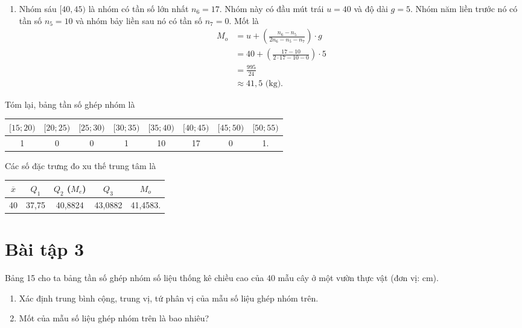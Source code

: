 \documentclass[
  letterpaper,
  DIV=11,
  numbers=noendperiod]{scrartcl}
\providecommand{\tightlist}{%
  \setlength{\itemsep}{0pt}\setlength{\parskip}{0pt}}\usepackage{longtable,booktabs,array}
\begin{document}
\begin{enumerate}
\def\labelenumi{\alph{enumi}.}
\setcounter{enumi}{2}
\tightlist
\item
  Nhóm sáu \([40,45)\) là nhóm có tần số lớn nhất \(n_6=17\). Nhóm này
  có đầu mút trái \(u=40\) và độ dài \(g=5\). Nhóm năm liền trước nó có
  tần số \(n_5=10\) và nhóm bảy liền sau nó có tần số \(n_7=0\). Mốt là
  \begin{align*}
  M_o 
   & = u + \left(\frac{n_6-n_5}{2n_6 - n_5 - n_7}\right)\cdot g \\
   & = 40 + \left(\frac{17-10}{2\cdot 17 - 10 - 0}\right)\cdot 5 \\
   & = \frac{995}{24} \\
   & \approx 41,5 \text{ (kg).}
  \end{align*}
\end{enumerate}

Tóm lại, bảng tần số ghép nhóm là

\begin{center}
\begin{tabular}{|c|c|c|c|c|c|c|c|}
\hline 
$[15;20)$ & $[20; 25)$ & $[25; 30)$ & $[30; 35)$ & $[35;40)$ & $[40; 45)$ & $[45;50)$ & $[50;55)$ \\
\hline 
1 & 0 & 0 & 1 & 10 & 17 & 0 & 1. \\
\hline
\end{tabular}
\end{center}

Các số đặc trưng đo xu thế trung tâm là

\begin{center}
\begin{tabular}{|c|c|c|c|c|}
\hline
$\overline{x}$ & $Q_1$ & $Q_2$ ($M_e$) & $Q_3$ & $M_o$ \\
\hline
40 & 37,75 & 40,8824 & 43,0882 & 41,4583. \\
\hline 
\end{tabular}
\end{center}

\section*{Bài tập 3}

Bảng 15 cho ta bảng tần số ghép nhóm số liệu thống kê chiều cao của 40
mẫu cây ở một vườn thực vật (đơn vị: cm).

\begin{enumerate}
\def\labelenumi{\alph{enumi}.}
\item
  Xác định trung bình cộng, trung vị, tứ phân vị của mẫu số liệu ghép
  nhóm trên.
\item
  Mốt của mẫu số liệu ghép nhóm trên là bao nhiêu?
\end{enumerate}
\end{document}
